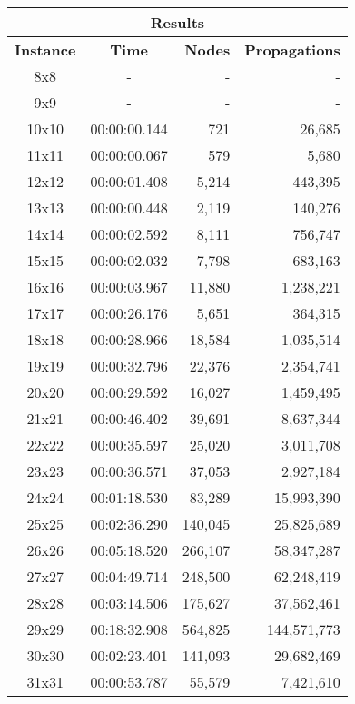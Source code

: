 
\begin{center}
    \begin{tabular}{|c|c|r|r|}
        \hline
        \multicolumn{4}{|c|}{\textbf{Results}} \\
        \hline
        \textbf{Instance} & \textbf{Time} & \textbf{Nodes} & \textbf{Propagations} \\
        
        \hline
		8x8 & - & - & - \\ \hline
		9x9 & - & - & - \\ \hline
		10x10 & 00:00:00.144 & 721 & 26,685 \\ \hline
		11x11 & 00:00:00.067 & 579 & 5,680 \\ \hline
		12x12 & 00:00:01.408 & 5,214 & 443,395 \\ \hline
		13x13 & 00:00:00.448 & 2,119 & 140,276 \\ \hline
		14x14 & 00:00:02.592 & 8,111 & 756,747 \\ \hline
		15x15 & 00:00:02.032 & 7,798 & 683,163 \\ \hline
		16x16 & 00:00:03.967 & 11,880 & 1,238,221 \\ \hline
		17x17 & 00:00:26.176 & 5,651 & 364,315 \\ \hline
		18x18 & 00:00:28.966 & 18,584 & 1,035,514 \\ \hline
		19x19 & 00:00:32.796 & 22,376 & 2,354,741 \\ \hline
		20x20 & 00:00:29.592 & 16,027 & 1,459,495 \\ \hline
		21x21 & 00:00:46.402 & 39,691 & 8,637,344 \\ \hline
		22x22 & 00:00:35.597 & 25,020 & 3,011,708 \\ \hline
		23x23 & 00:00:36.571 & 37,053 & 2,927,184 \\ \hline
		24x24 & 00:01:18.530 & 83,289 & 15,993,390 \\ \hline
		25x25 & 00:02:36.290 & 140,045 & 25,825,689 \\ \hline
		26x26 & 00:05:18.520 & 266,107 & 58,347,287 \\ \hline
		27x27 & 00:04:49.714 & 248,500 & 62,248,419 \\ \hline
		28x28 & 00:03:14.506 & 175,627 & 37,562,461 \\ \hline
		29x29 & 00:18:32.908 & 564,825 & 144,571,773 \\ \hline
		30x30 & 00:02:23.401 & 141,093 & 29,682,469 \\ \hline
		31x31 & 00:00:53.787 & 55,579 & 7,421,610 \\ \hline

\end{tabular}
\end{center}
